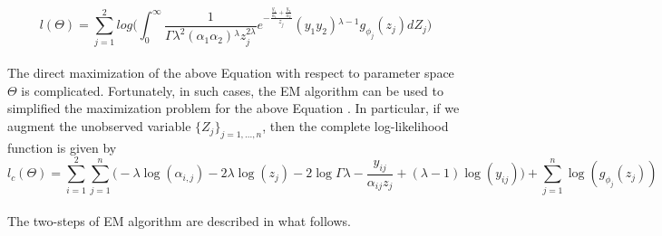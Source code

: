 \documentclass[12pt]{article}%
\theoremstyle{definition}
\theoremstyle{remark}
\begin{document}
\begin{equation*}
	l(\Theta)=\sum _{j=1}^2 log\bigg(\int _0^{\infty }\frac{1}{\Gamma \lambda ^2 \left(\alpha _1 \alpha _2\right){}^{\lambda } z_j^{2 \lambda }}e^{-\frac{\frac{y_1}{\alpha _1}+\frac{y_2}{\alpha _2}}{z_j}}\left(y_1 y_2\right){}^{\lambda -1}g_{\phi_{j}}(z_j) dZ_j\bigg)
\end{equation*}\\
The direct maximization of the above  Equation  with respect to parameter space $\Theta$ is complicated. Fortunately, in such cases, the EM algorithm can be used to simplified the maximization problem for the above  Equation . In particular, if we augment the unobserved variable 
$\{Z_j\}_{j=1,...,n}$, then the complete log-likelihood function is given by
\begin{equation*}
	l_c(\Theta)=\sum _{i=1}^2\sum _{j=1}^n\bigg( -\lambda\log(\alpha_{i,j})-2\lambda \log(z_j)-2\log\Gamma\lambda-\frac{y_{ij}}{\alpha_{ij}z_j }+(\lambda-1) \log(y_{ij})\bigg)+\sum _{j=1}^n\log(g_{\phi_j}(z_j))
\end{equation*}\\
The two-steps of EM algorithm are described in what follows.\\
\end{document}
